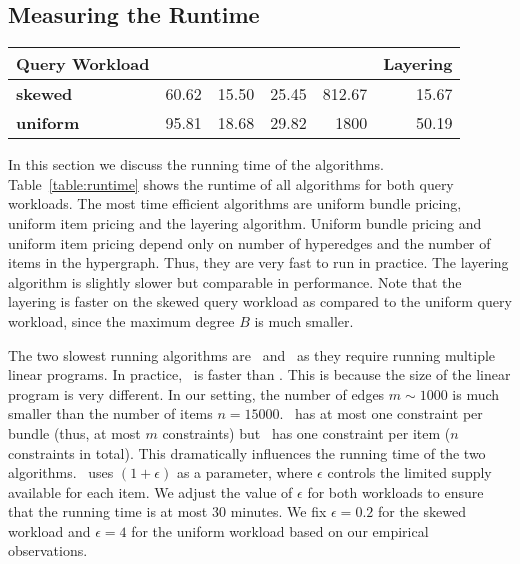 \subsection{Measuring the Runtime}

\begin{table*}[] \centering
	\begin{small}
		\begin{tabular}{@{}lrrrrr@{}}\toprule
			\textbf{Query Workload} & \textbf{\lpip} & \textbf{\ubp} & \textbf{\uip} & \textbf{\cip} & \textbf{Layering}  \\ \midrule
			
			\textbf{skewed} &  60.62 & 15.50 & 25.45 & 812.67 & 15.67 \\ \hdashline
			\textbf{uniform} &  95.81 & 18.68 &  29.82 &1800 & 50.19 \\
			\bottomrule
		\end{tabular}
	\end{small}
	\caption{Algorithm running times (in seconds) for different workloads.}
	\label{table:runtime}
\end{table*}

In this section we discuss the running time of the algorithms. Table~\ref{table:runtime} shows the runtime of all algorithms for both query workloads. The most time efficient algorithms are uniform bundle pricing, uniform item pricing and the layering algorithm. Uniform bundle pricing and uniform item pricing depend only on number of hyperedges and the number of items in the hypergraph. Thus, they are very fast to run in practice. The layering algorithm is slightly slower but comparable in performance. Note that the layering is faster on the skewed query workload as compared to the uniform query workload, since the maximum degree $B$ is much smaller. 

The two slowest running algorithms are \lpip\ and \cip\ as they require running multiple linear programs. In practice, \lpip\ is faster than \cip. This is because the size of the linear program is very different. In our setting, the number of edges $m \sim 1000$ is much smaller than the number of items $n = 15000$. \lpip\  has at most one constraint per bundle (thus, at most $m$ constraints) but \cip\ has one constraint per item ($n$ constraints in total). This dramatically influences the running time of the two algorithms. \cip\ uses $(1+\epsilon)$ as a parameter, where $\epsilon$ controls the limited supply available for each item. We adjust the value of $\epsilon$ for both workloads to ensure that the running time is at most $30$ minutes. We fix $\epsilon = 0.2$ for the skewed workload and $\epsilon = 4$ for the uniform workload based on our empirical observations.


